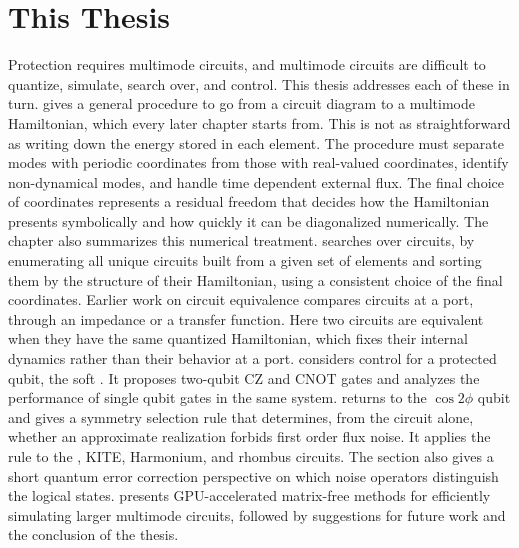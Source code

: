 \FloatBarrier

\section{This Thesis}\label{sec:thesis_outline}

Protection requires multimode circuits, and multimode circuits are difficult to quantize, simulate, search over, and control.
This thesis addresses each of these in turn.
 gives a general procedure to go from a circuit diagram to a multimode Hamiltonian, which every later chapter starts from.
This is not as straightforward as writing down the energy stored in each element.
The procedure must separate modes with periodic coordinates from those with real-valued coordinates, identify non-dynamical modes, and handle time dependent external flux.
The final choice of coordinates represents a residual freedom that decides how the Hamiltonian presents symbolically and how quickly it can be diagonalized numerically.
The chapter also summarizes this numerical treatment.
 searches over circuits, by enumerating all unique circuits built from a given set of elements and sorting them by the structure of their Hamiltonian, using a consistent choice of the final coordinates.
Earlier work on circuit equivalence compares circuits at a port, through an impedance or a transfer function.
Here two circuits are equivalent when they have the same quantized Hamiltonian, which fixes their internal dynamics rather than their behavior at a port.
 considers control for a protected qubit, the soft \zps.
It proposes two-qubit CZ and CNOT gates and analyzes the performance of single qubit gates in the same system.
 returns to the $\cos 2\phi$ qubit and gives a symmetry selection rule that determines, from the circuit alone, whether an approximate realization forbids first order flux noise.
It applies the rule to the \zps, KITE, Harmonium, and rhombus circuits.
The section also gives a short quantum error correction perspective on which noise operators distinguish the logical states.
 presents GPU-accelerated matrix-free methods for efficiently simulating larger multimode circuits, followed by suggestions for future work and the conclusion of the thesis.
